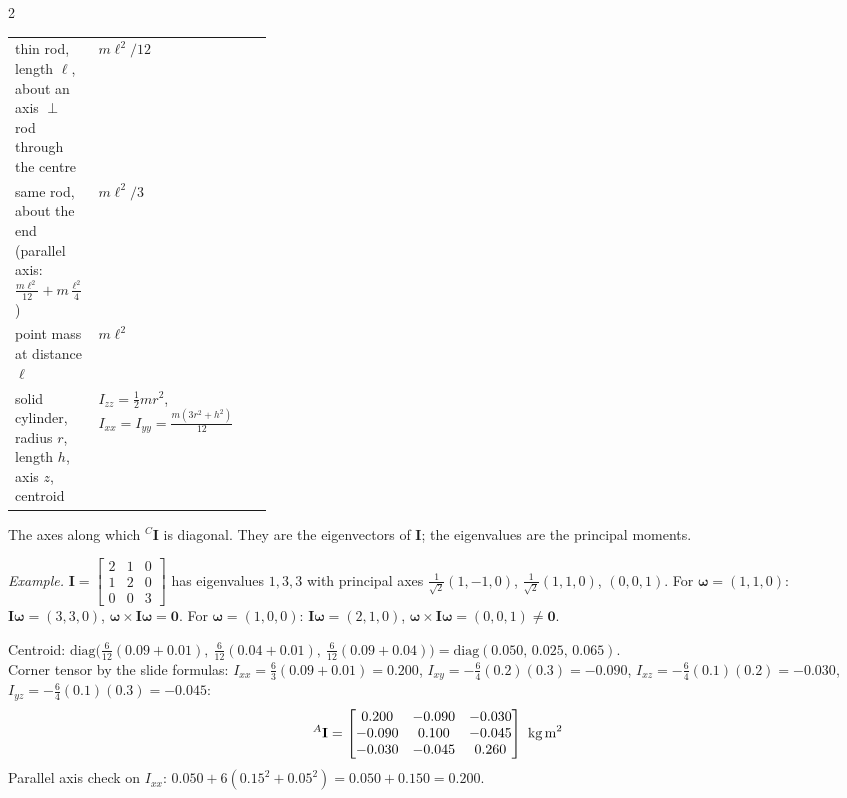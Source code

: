 \begin{multicols}{2}
\begin{fbx}
\begin{tabularx}{\linewidth}{@{}>{\raggedright\arraybackslash}p{0.30\linewidth}X@{}}
thin rod, length $\ell$, about an axis $\perp$ rod through the centre & $m\ell^2/12$\\
same rod, about the end (parallel axis: $\tfrac{m\ell^2}{12}+m\tfrac{\ell^2}4$) & $m\ell^2/3$\\
point mass at distance $\ell$ & $m\ell^2$\\
solid cylinder, radius $r$, length $h$, axis $z$, centroid & $I_{zz}=\tfrac12mr^2$, $I_{xx}=I_{yy}=\tfrac{m(3r^2+h^2)}{12}$\\
\bottomrule
\end{tabularx}
\end{fbx}
\begin{fbx}
The axes along which ${}^C\mathbf I$ is diagonal. They are the eigenvectors of $\mathbf I$; the eigenvalues are the principal moments.
\end{fbx}
\textit{Example.} $\mathbf I=\begin{bmatrix}2&1&0\\1&2&0\\0&0&3\end{bmatrix}$ has eigenvalues $1,3,3$ with principal axes $\tfrac1{\sqrt2}(1,-1,0)$, $\tfrac1{\sqrt2}(1,1,0)$, $(0,0,1)$. For $\boldsymbol\omega=(1,1,0)$: $\mathbf I\boldsymbol\omega=(3,3,0)$, $\boldsymbol\omega\times\mathbf I\boldsymbol\omega=\mathbf 0$. For $\boldsymbol\omega=(1,0,0)$: $\mathbf I\boldsymbol\omega=(2,1,0)$, $\boldsymbol\omega\times\mathbf I\boldsymbol\omega=(0,0,1)\neq\mathbf 0$. \chk
\begin{worked}[box $m=6$ kg, $W=0.2$, $L=0.3$, $H=0.1$ m]
Centroid: $\mathrm{diag}\big(\tfrac6{12}(0.09+0.01),\ \tfrac6{12}(0.04+0.01),\ \tfrac6{12}(0.09+0.04)\big)=\mathrm{diag}(0.050,\,0.025,\,0.065)$.\\
Corner tensor by the slide formulas: $I_{xx}=\tfrac63(0.09+0.01)=0.200$, $I_{xy}=-\tfrac64(0.2)(0.3)=-0.090$, $I_{xz}=-\tfrac64(0.1)(0.2)=-0.030$, $I_{yz}=-\tfrac64(0.1)(0.3)=-0.045$:
\[{}^A\mathbf I=\begin{bmatrix}0.200&-0.090&-0.030\\-0.090&0.100&-0.045\\-0.030&-0.045&0.260\end{bmatrix}\ \text{kg\,m}^2\]
Parallel axis check on $I_{xx}$: $0.050+6(0.15^2+0.05^2)=0.050+0.150=0.200$. \chk
\end{worked}


\end{multicols}

